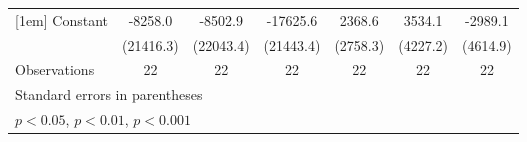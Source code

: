 {\begin{tabular}{l*{6}{c}}
[1em]
Constant            &     -8258.0         &     -8502.9         &    -17625.6         &      2368.6         &      3534.1         &     -2989.1         \\
                    &   (21416.3)         &   (22043.4)         &   (21443.4)         &    (2758.3)         &    (4227.2)         &    (4614.9)         \\
\hline
Observations        &          22         &          22         &          22         &          22         &          22         &          22         \\
\hline\hline
\multicolumn{7}{l}{\footnotesize Standard errors in parentheses}\\
\multicolumn{7}{l}{\footnotesize \sym{*} \(p<0.05\), \sym{**} \(p<0.01\), \sym{***} \(p<0.001\)}\\
\end{tabular}
}
